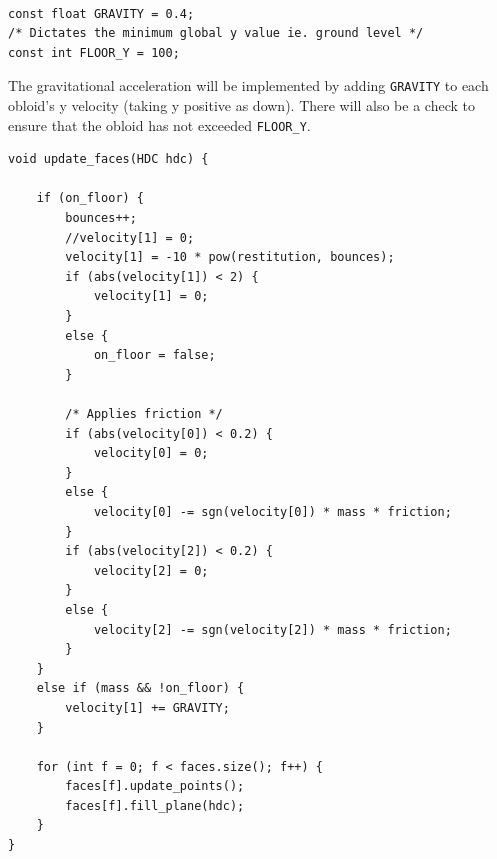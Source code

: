 \documentclass{article}
\begin{document}
\begin{lstlisting}

const float GRAVITY = 0.4;
/* Dictates the minimum global y value ie. ground level */
const int FLOOR_Y = 100;

\end{lstlisting}

The gravitational acceleration will be implemented by adding \verb|GRAVITY| to each obloid's y velocity (taking y positive as down). There will also be a check to ensure that the obloid has not exceeded \verb|FLOOR_Y|.
\newpage
\begin{lstlisting}
void update_faces(HDC hdc) {
	
	if (on_floor) {
		bounces++;
		//velocity[1] = 0;
		velocity[1] = -10 * pow(restitution, bounces);
		if (abs(velocity[1]) < 2) {
			velocity[1] = 0;
		}
		else {
			on_floor = false;
		}

		/* Applies friction */
		if (abs(velocity[0]) < 0.2) {
			velocity[0] = 0;
		}
		else {
			velocity[0] -= sgn(velocity[0]) * mass * friction;
		}
		if (abs(velocity[2]) < 0.2) {
			velocity[2] = 0;
		}
		else {
			velocity[2] -= sgn(velocity[2]) * mass * friction;
		}
	}
	else if (mass && !on_floor) {
		velocity[1] += GRAVITY;
	}
			
	for (int f = 0; f < faces.size(); f++) {
		faces[f].update_points();
		faces[f].fill_plane(hdc);
	}
}
\end{lstlisting}
\end{document}
